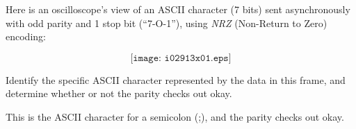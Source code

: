 

Here is an oscilloscope's view of an ASCII character (7 bits) sent asynchronously with odd parity and 1 stop bit (``7-O-1''), using {\it NRZ} (Non-Return to Zero) encoding:

$$\texttt{[image: i02913x01.eps]}$$

Identify the specific ASCII character represented by the data in this frame, and determine whether or not the parity checks out okay.







This is the ASCII character for a semicolon (;), and the parity checks out okay.











